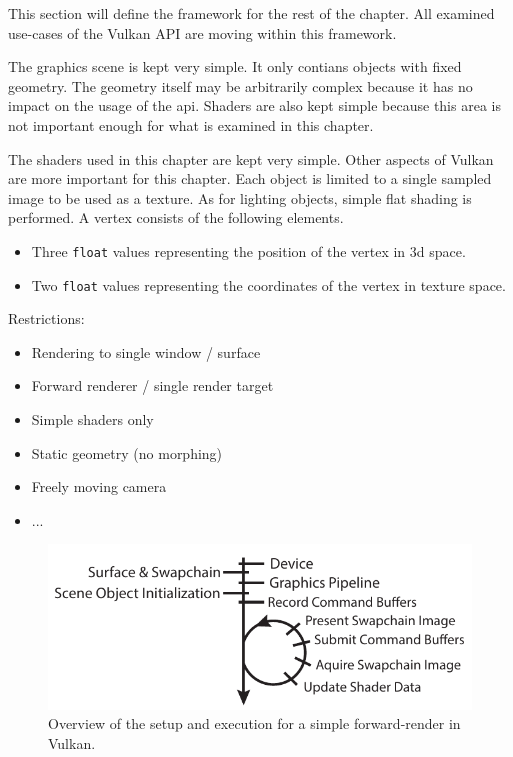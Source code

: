   This section will define the framework for the rest of the chapter.
  All examined use-cases of the Vulkan API are moving within this framework.


  The graphics scene is kept very simple.
  It only contians objects with fixed geometry.
  The geometry itself may be arbitrarily complex because it has no impact on the usage of the \gls{api}.
  Shaders are also kept simple because this area is not important enough for what is examined in this chapter.

  The shaders used in this chapter are kept very simple.
  Other aspects of Vulkan are more important for this chapter.
  Each object is limited to a single sampled image to be used as a texture.
  As for lighting objects, simple flat shading is performed.
  A vertex consists of the following elements.
  \begin{itemize}
    \item Three \lstinline{float} values representing the position of the vertex in \gls{3d} space.
    \item Two \lstinline{float} values representing the coordinates of the vertex in texture space.
  \end{itemize}

  Restrictions:
  \begin{itemize}
    \item Rendering to single window / surface
    \item Forward renderer / single render target
    \item Simple shaders only
    \item Static geometry (no morphing)
    \item Freely moving camera
    \item ...
  \end{itemize}

  \begin{figure}
    \includegraphics{Main/Images/RenderSetupAndLoopSimple}
    \centering
    \caption{Overview of the setup and execution for a simple forward-render in Vulkan.}
    \label{fig:RenderSetupAndLoopSimple}
  \end{figure}


